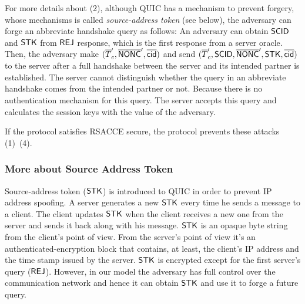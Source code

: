 For more details about (2), although QUIC has a mechanism to prevent forgery,
whose mechanisms is called \textit{source-address token}
(see below), the adversary can forge an abbreviate handshake
query as follows: An adversary can obtain $\mathsf{SCID}$ and $\mathsf{STK}$ from $\mathsf{REJ}$
response, which is the first response from a server oracle.
Then, the adversary make $(\overline{T}_c^{\prime},
\overline{\mathsf{NONC}}^{\prime}, \overline{\mathsf{cid}})$ and send $(\overline{T}_c^{\prime},
\mathsf{SCID}, \overline{\mathsf{NONC}}^{\prime}, \mathsf{STK}, \overline{\mathsf{cid}})$ to the server after a
full handshake between the server and its intended partner
is established.
The server cannot distinguish whether the query in an abbreviate handshake
comes from the intended partner or not. Because there is no
authentication mechanism for this query. The server accepts
this query and calculates the session keys with the value
of the adversary.

If the protocol satisfies RSACCE secure, the protocol prevents these attacks (1)~(4).
\fi
\subsubsection{More about Source Address Token} \label{sec:source_address_token}
Source-address token ($\mathsf{STK}$) is introduced to QUIC in order to
prevent IP address spoofing.
A server generates a new $\mathsf{STK}$ every time he sends a
message to a client.
The client updates $\mathsf{STK}$ when the client receives a new one from
the server and sends it back along with his message.
$\mathsf{STK}$ is an opaque byte string from the client's point of view.
From the server's point of view it's an authenticated-encryption
block that contains, at least, the client's IP address and the time
stamp issued by the server.
$\mathsf{STK}$ is encrypted except for the first server's query ($\mathsf{REJ}$).
However, in our model the adversary has full control over the
communication network and hence it can obtain $\mathsf{STK}$ and use it to
forge a future query.
\fi